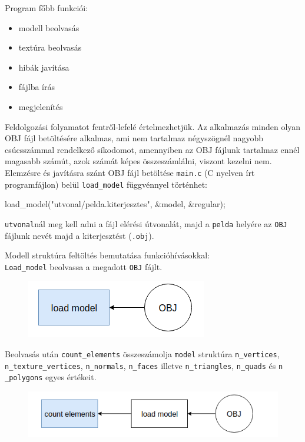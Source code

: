 Program főbb funkciói:
 \begin{itemize}
\item modell beolvasás
\item textúra beolvasás
\item hibák javítása
\item fájlba írás
\item megjelenítés
\end{itemize}
\bigskip
Feldolgozási folyamatot fentről-lefelé értelmezhetjük.
\newpage
{}
Az alkalmazás minden olyan OBJ fájl betöltésére alkalmas, ami nem tartalmaz négyszögnél nagyobb csúcsszámmal rendelkező síkodomot, amennyiben az OBJ fájlunk tartalmaz ennél magasabb számút, azok számát képes összeszámlálni, viszont kezelni nem.\\

Elemzésre és javításra szánt OBJ fájl betöltése \texttt{main.c} (C nyelven írt programfájlon) belül \texttt{load\_model} függvénnyel történhet:
\bigskip
\begin{cpp}
load_model("utvonal/pelda.kiterjesztes", &model, &regular);
\end{cpp}
\bigskip

\texttt{utvonal}nál meg kell adni a fájl elérési útvonalát, majd a \texttt{pelda} helyére az \texttt{OBJ} fájlunk nevét majd a kiterjesztést (\texttt{.obj}).
\bigskip

\noindent Modell struktúra feltöltés bemutatása funkcióhívásokkal:\\

\texttt{Load\_model} beolvassa a megadott \texttt{OBJ} fájlt.
\begin{figure}[h]
\centering
\includegraphics[scale=0.5]{images/load.png}
\end{figure}
\bigskip

Beolvasás után \texttt{count\_elements} összeszámolja \texttt{model} struktúra \texttt{n\_vertices},  \texttt{\\n\_texture\_vertices}, \texttt{n\_normals}, \texttt{n\_faces} illetve \texttt{n\_triangles}, \texttt{n\_quads} és \texttt{n\\\_polygons} egyes értékeit.
\begin{figure}[h]
\centering
\includegraphics[scale=0.5]{images/count.png}
\end{figure}
\bigskip

